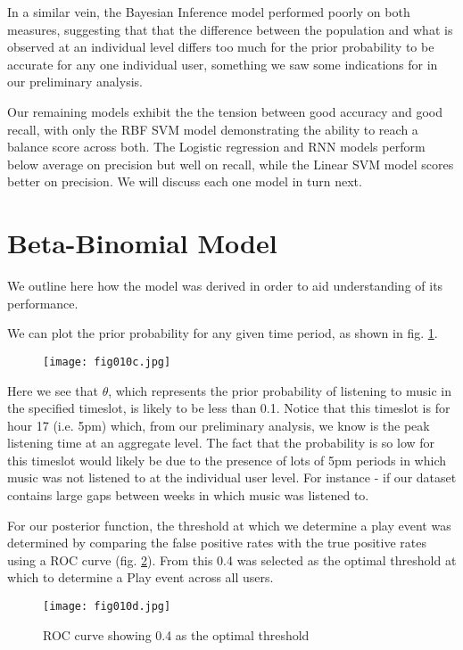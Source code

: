 In a similar vein, the Bayesian Inference model performed poorly on both measures, suggesting that that the difference between the population and what is observed at an individual level differs too much for the prior probability to be accurate for any one individual user, something we saw some indications for in our preliminary analysis. 

Our remaining models exhibit the the tension between good accuracy and good recall, with only the RBF SVM model demonstrating the ability to reach a balance score across both. The Logistic regression and RNN models perform below average on precision but well on recall, while the Linear SVM model scores better on precision. We will discuss each one model in turn next.
 
\section{Beta-Binomial Model}

We outline here how the model was derived in order to aid understanding of its performance. 

We can plot the prior probability for any given time period, as shown in fig. \ref{fig10c}.

\begin{figure}[h!]
	\centering
	\texttt{[image: fig010c.jpg]}
	\caption{}
	\label{fig10c}
\end{figure} 

Here we see that $\theta$, which represents the prior probability of listening to music in the specified timeslot, is likely to be less than 0.1. Notice that this timeslot is for hour 17 (i.e. 5pm) which, from our preliminary analysis, we  know is the peak listening time at an aggregate level. The fact that the probability is so low for this timeslot would likely be due to the presence of lots of 5pm periods in which music was not listened to at the individual user level. For instance - if our dataset contains large gaps between weeks in which music was listened to. 

For our posterior function, the threshold at which we determine a play event was determined by comparing the false positive rates with the true positive rates using a ROC curve (fig. \ref{fig10d}). From this 0.4 was selected as the optimal threshold at which to determine a Play event across all users.

\begin{figure}[h!]
	\centering
	\texttt{[image: fig010d.jpg]}
	\caption{ROC curve showing 0.4 as the optimal threshold}
	\label{fig10d}
\end{figure} 

